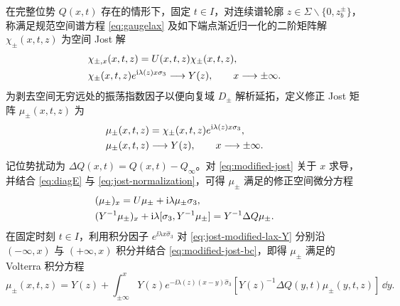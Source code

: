 在完整位势 $Q(x,t)$ 存在的情形下，固定 $t\in I$，对连续谱轮廓 $z\in\Sigma\mathbin{\backslash}\{0,z_b^\pm\}$，称满足规范空间谱方程 \eqref{eq:gaugelax} 及如下端点渐近归一化的二阶矩阵解 $\chi_\pm(x,t,z)$ 为空间 Jost 解
\begin{equation}\label{eq:jost-normalization}
\begin{aligned}
&\chi_{\pm,x}(x,t,z)=U(x,t,z)\chi_\pm(x,t,z),\\
&\chi_\pm(x,t,z)e^{\mathrm{i}\lambda(z)x\sigma_3}\longrightarrow Y(z),\qquad x\longrightarrow\pm\infty.
\end{aligned}
\end{equation}
为剥去空间无穷远处的振荡指数因子以便向复域 $D_\pm$ 解析延拓，定义修正 Jost 矩阵 $\mu_\pm(x,t,z)$ 为
\begin{align}
&\mu_\pm(x,t,z)=\chi_\pm(x,t,z)e^{\mathrm{i}\lambda(z)x\sigma_3},\label{eq:modified-jost}\\
&\mu_\pm(x,t,z)\longrightarrow Y(z),\qquad x\longrightarrow\pm\infty.\label{eq:modified-jost-bc}
\end{align}
记位势扰动为 $\Delta Q(x,t)=Q(x,t)-Q_\infty$。对 \eqref{eq:modified-jost} 关于 $x$ 求导，并结合 \eqref{eq:diagE} 与 \eqref{eq:jost-normalization}，可得 $\mu_\pm$ 满足的修正空间微分方程
\begin{align}
&(\mu_\pm)_x=U\mu_\pm+\mathrm{i}\lambda\mu_\pm\sigma_3,\label{eq:jost-modified-lax}\\
&(Y^{-1}\mu_\pm)_x+\mathrm{i}\lambda[\sigma_3,Y^{-1}\mu_\pm]
=Y^{-1}\Delta Q\mu_\pm.\label{eq:jost-modified-lax-Y}
\end{align}
在固定时刻 $t\in I$，利用积分因子 $e^{\ii\lambda x\widehat{\sigma}_3}$ 对 \eqref{eq:jost-modified-lax-Y} 分别沿 $(-\infty,x)$ 与 $(+\infty,x)$ 积分并结合 \eqref{eq:modified-jost-bc}，即得 $\mu_\pm$ 满足的 Volterra 积分方程
\begin{equation}\label{eq:volterra}
\mu_\pm(x,t,z)=Y(z)+\int_{\pm\infty}^{x}
Y(z)e^{-\ii\lambda(z)(x-y)\widehat{\sigma}_3}\!\left[
Y(z)^{-1}\Delta Q(y,t)\mu_\pm(y,t,z)\right]\,\dd y.
\end{equation}

